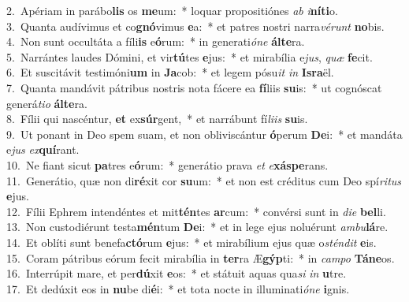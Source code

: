 {2.~}Apériam in parábo\textbf{lis} os \textbf{me}um:~* loquar propositiónes \textit{ab} \textit{i}\textbf{ní}\textbf{ti}o.\\
{3.~}Quanta audívimus et co\textbf{gnó}vimus \textbf{e}a:~* et patres nostri narra\textit{vé}\textit{runt} \textbf{no}bis.\\
{4.~}Non sunt occultáta a fíli\textbf{is} e\textbf{ó}rum:~* in generati\textit{ó}\textit{ne} \textbf{ál}\textbf{te}ra.\\
{5.~}Narrántes laudes Dómini, et vir\textbf{tú}tes \textbf{e}jus:~* et mirabília e\textit{jus}, \textit{quæ} \textbf{fe}cit.\\
{6.~}Et suscitávit testimóni\textbf{um} in \textbf{Ja}cob:~* et legem pósu\textit{it} \textit{in} \textbf{Is}\textbf{ra}ël.\\
{7.~}Quanta mandávit pátribus nostris nota fácere ea \textbf{fí}liis \textbf{su}is:~* ut cognóscat generá\textit{ti}\textit{o} \textbf{ál}\textbf{te}ra.\\
{8.~}Fílii qui nascéntur, \textbf{et} ex\textbf{súr}gent,~* et narrábunt fí\textit{li}\textit{is} \textbf{su}is.\\
{9.~}Ut ponant in Deo spem suam, et non obliviscántur \textbf{ó}perum \textbf{De}i:~* et mandáta e\textit{jus} \textit{ex}\textbf{quí}rant.\\
{10.~}Ne fiant sicut \textbf{pa}tres e\textbf{ó}rum:~* generátio prava \textit{et} \textit{e}\textbf{xá}\textbf{spe}rans.\\
{11.~}Generátio, quæ non di\textbf{ré}xit cor \textbf{su}um:~* et non est créditus cum Deo spí\textit{ri}\textit{tus} \textbf{e}jus.\\
{12.~}Fílii Ephrem intendéntes et mit\textbf{tén}tes \textbf{ar}cum:~* convérsi sunt in \textit{di}\textit{e} \textbf{bel}li.\\
{13.~}Non custodiérunt testa\textbf{mén}tum \textbf{De}i:~* et in lege ejus noluérunt \textit{am}\textit{bu}\textbf{lá}re.\\
{14.~}Et oblíti sunt benefa\textbf{ctó}rum \textbf{e}jus:~* et mirabílium ejus quæ o\textit{stén}\textit{dit} \textbf{e}is.\\
{15.~}Coram pátribus eórum fecit mirabília in \textbf{ter}ra Æ\textbf{gýp}ti:~* in \textit{cam}\textit{po} \textbf{Tá}\textbf{ne}os.\\
{16.~}Interrúpit mare, et per\textbf{dú}xit \textbf{e}os:~* et státuit aquas qua\textit{si} \textit{in} \textbf{u}tre.\\
{17.~}Et dedúxit eos in \textbf{nu}be di\textbf{é}i:~* et tota nocte in illuminati\textit{ó}\textit{ne} \textbf{i}gnis.\\
